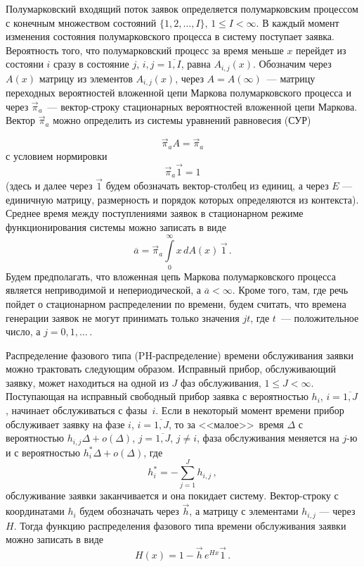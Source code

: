\begin{multicols}{2}
Полумарковский входящий поток заявок определяется полумарковским процессом с 
конечным множеством состояний $\{1,2,\ldots,I\}$, $1\le I<\infty$. В каждый 
момент изменения состояния полумарковского процесса в систему поступает заявка. 
Вероятность того, что полумарковский процесс за время меньше $x$ перейдет из 
состояни $i$ сразу в состояние $j$, $i,j=\overline{1,I}$, равна $A_{i,j}(x)$. 
Обозначим через $A(x)$ матрицу из элементов $A_{i,j}(x)$, через 
$A=A(\infty)$~--- матрицу переходных вероятностей вложенной цепи Маркова 
полумарковского процесса и через $\vec\pi_a$~--- вектор-строку стационарных 
вероятностей вложенной цепи Маркова. Вектор $\vec\pi_a$ можно определить из 
системы уравнений равновесия (СУР)

\noindent
$$
\vec\pi_a A = \vec\pi_a
$$
с условием нормировки
$$
\vec\pi_a \vec1 = 1
$$
(здесь и далее через $\vec1$ будем обозначать вектор-столбец из единиц,
а через $E$ --- единичную матрицу, размерность и порядок которых
определяются из контекста).
Среднее время между поступлениями заявок в стационарном режиме
функционирования системы можно записать в виде
$$
\overline a = \vec\pi_a \int\limits_0^\infty x\, dA(x)\, \vec1\,.
$$
Будем предполагать, что вложенная цепь Маркова полумарковского процесса
является неприводимой и непериодической,
а $\overline a < \infty$.
Кроме того, там, где речь пойдет о стационарном распределении
по времени, будем считать, что времена генерации заявок не могут
принимать только значения $jt$, где $t$~--- положительное число,
а $j=0,1,\ldots\,.$


Распределение фазового типа (PH-рас\-пре\-де\-ле\-ние) времени обслуживания
заявки можно трактовать следующим образом. Исправный прибор, обслуживающий 
заявку, может находиться на одной из $J$ фаз обслуживания, $1\le J <\infty$. 
Поступающая на исправный свободный прибор заявка с вероятностью $h_i$, 
$i=\overline{1,J}$, начинает обслуживаться с фазы~$i$. Если в некоторый момент 
времени прибор обслуживает заявку на фазе $i$, $i=\overline{1,J}$, то за 
<<малое>>\ время $\Delta$ с вероятностью $h_{i,j}\Delta+o(\Delta)$, 
$j=\overline{1,J}$, $j\ne i$, фаза обслуживания меняется на $j$-ю и с 
вероятностью $h_i^* \Delta+o(\Delta)$, где $$ h_i^*=- \sum\limits_{j=1}^J 
h_{i,j}\,,
$$
обслуживание заявки заканчивается и она покидает систему.
Вектор-строку с координатами $h_i$ будем обозначать через
$\vec h$, а матрицу с элементами $h_{i,j}$ --- через $H$.
Тогда функцию распределения фазового типа времени обслуживания
заявки можно записать в виде
$$
H(x) = 1-\vec h\, e^{Hx} \vec1\,.
$$



\end{multicols}
